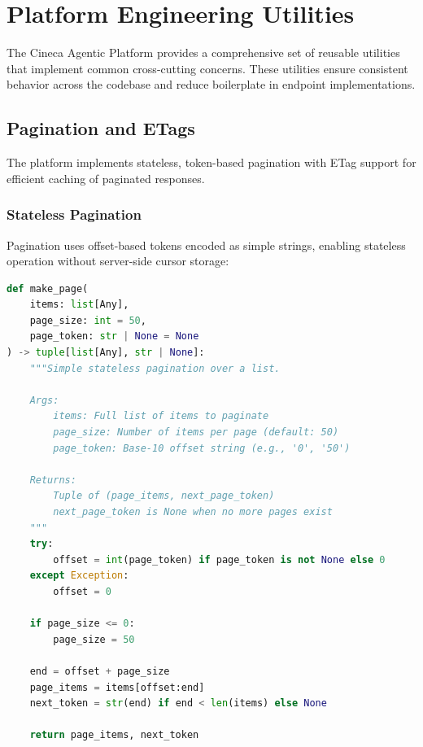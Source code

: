 
\section{Platform Engineering Utilities}
\label{sec:platform-utilities}

The Cineca Agentic Platform provides a comprehensive set of reusable utilities that implement common cross-cutting concerns. These utilities ensure consistent behavior across the codebase and reduce boilerplate in endpoint implementations.

\subsection{Pagination and ETags}
\label{subsec:pagination}

The platform implements stateless, token-based pagination with ETag support for efficient caching of paginated responses.

\subsubsection{Stateless Pagination}

Pagination uses offset-based tokens encoded as simple strings, enabling stateless operation without server-side cursor storage:

\begin{lstlisting}[language=Python, caption={Pagination implementation from \texttt{src/utils/pagination.py}.}]
def make_page(
    items: list[Any], 
    page_size: int = 50, 
    page_token: str | None = None
) -> tuple[list[Any], str | None]:
    """Simple stateless pagination over a list.
    
    Args:
        items: Full list of items to paginate
        page_size: Number of items per page (default: 50)
        page_token: Base-10 offset string (e.g., '0', '50')
    
    Returns:
        Tuple of (page_items, next_page_token)
        next_page_token is None when no more pages exist
    """
    try:
        offset = int(page_token) if page_token is not None else 0
    except Exception:
        offset = 0
    
    if page_size <= 0:
        page_size = 50
    
    end = offset + page_size
    page_items = items[offset:end]
    next_token = str(end) if end < len(items) else None
    
    return page_items, next_token
\end{lstlisting}

